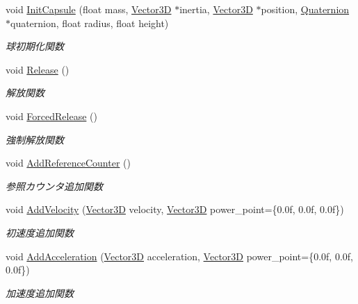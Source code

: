 \begin{DoxyCompactItemize}
void \mbox{\hyperlink{class_bullet_physics_object_a6dc79cf0ac34446de037eac7b910d30b}{Init\+Capsule}} (float mass, \mbox{\hyperlink{class_vector3_d}{Vector3D}} $\ast$inertia, \mbox{\hyperlink{class_vector3_d}{Vector3D}} $\ast$position, \mbox{\hyperlink{_vector3_d_8h_a3ee38c9c46d9851e33a9a1113328dafc}{Quaternion}} $\ast$quaternion, float radius, float height)
\begin{DoxyCompactList}\small\item\em 球初期化関数 \end{DoxyCompactList}\item 
void \mbox{\hyperlink{class_bullet_physics_object_a0bb55d6e1644f45e35bcb8e2e9c945eb}{Release}} ()
\begin{DoxyCompactList}\small\item\em 解放関数 \end{DoxyCompactList}\item 
void \mbox{\hyperlink{class_bullet_physics_object_a589046e8bbc361be462f8fe343ccec0b}{Forced\+Release}} ()
\begin{DoxyCompactList}\small\item\em 強制解放関数 \end{DoxyCompactList}\item 
void \mbox{\hyperlink{class_bullet_physics_object_a2d8bbb2460766e646eabbff414f54cde}{Add\+Reference\+Counter}} ()
\begin{DoxyCompactList}\small\item\em 参照カウンタ追加関数 \end{DoxyCompactList}\item 
void \mbox{\hyperlink{class_bullet_physics_object_a2a1d883ae9c1bfc42a7ea3e48095deb0}{Add\+Velocity}} (\mbox{\hyperlink{class_vector3_d}{Vector3D}} velocity, \mbox{\hyperlink{class_vector3_d}{Vector3D}} power\+\_\+point=\{0.\+0f, 0.\+0f, 0.\+0f\})
\begin{DoxyCompactList}\small\item\em 初速度追加関数 \end{DoxyCompactList}\item 
void \mbox{\hyperlink{class_bullet_physics_object_a1d7e12c68b4959fefd36cddb4f5f59a2}{Add\+Acceleration}} (\mbox{\hyperlink{class_vector3_d}{Vector3D}} acceleration, \mbox{\hyperlink{class_vector3_d}{Vector3D}} power\+\_\+point=\{0.\+0f, 0.\+0f, 0.\+0f\})
\begin{DoxyCompactList}\small\item\em 加速度追加関数 \end{DoxyCompactList}\end{DoxyCompactItemize}
